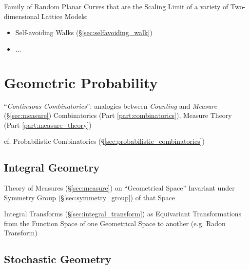 Family of Random Planar Curves that are the Scaling Limit of a variety of
Two-dimensional Lattice Models:
\begin{itemize}
  \item Self-avoiding Walks (\S\ref{sec:selfavoiding_walk})
  \item ...
\end{itemize}



\section{Geometric Probability}\label{sec:geometric_probability}

``\emph{Continuous Combinatorics}'': analogies between \emph{Counting} and
\emph{Measure} (\S\ref{sec:measure}) \fist Combinatorics (Part
\ref{part:combinatorics}), Measure Theory (Part \ref{part:measure_theory})

cf. Probabilistic Combinatorics (\S\ref{sec:probabilistic_combinatorics})



\subsection{Integral Geometry}\label{sec:integral_geometry}

Theory of Measures (\S\ref{sec:measure}) on ``Geometrical Space'' Invariant
under Symmetry Group (\S\ref{sec:symmetry_group}) of that Space

Integral Transforms (\S\ref{sec:integral_transform}) as Equivariant
Transformations from the Function Space of one Geometrical Space to another
(e.g. Radon Transform)



\subsection{Stochastic Geometry}\label{sec:stochastic_geometry}



